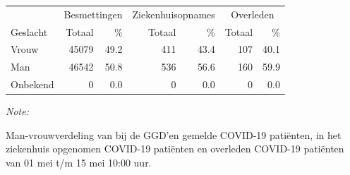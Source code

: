 \documentclass[
  english,
  man,floatsintext]{apa6}
\begin{document}
\begin{table}
\centering\begingroup\fontsize{11}{13}\selectfont

\begin{threeparttable}
\begin{tabular}{lrrrrrr}
\toprule
\multicolumn{1}{c}{ } & \multicolumn{2}{c}{Besmettingen} & \multicolumn{2}{c}{Ziekenhuisopnames} & \multicolumn{2}{c}{Overleden} \\
\cmidrule(l{3pt}r{3pt}){2-3} \cmidrule(l{3pt}r{3pt}){4-5} \cmidrule(l{3pt}r{3pt}){6-7}
Geslacht & Totaal & \% & Totaal & \% & Totaal & \%\\
\midrule
Vrouw & 45079 & 49.2 & 411 & 43.4 & 107 & 40.1\\
Man & 46542 & 50.8 & 536 & 56.6 & 160 & 59.9\\
Onbekend & 0 & 0.0 & 0 & 0.0 & 0 & 0.0\\
\bottomrule
\end{tabular}
\begin{tablenotes}
\item \textit{Note: } 
\item Man-vrouwverdeling van bij de GGD’en gemelde COVID-19 patiënten, in het ziekenhuis opgenomen COVID-19 patiënten en overleden COVID-19 patiënten van 01 mei t/m 15 mei 10:00 uur.
\end{tablenotes}
\end{threeparttable}
\endgroup{}
\end{table}
\newpage
\end{document}

